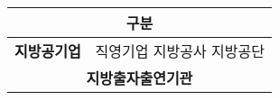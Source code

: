 \begin{tabular}{c|p{2cm}}
\toprule
\multicolumn{2}{c}{\textbf{구분}} \\
\midrule
\textbf{지방공기업} & 직영기업 \newline 지방공사 \newline  지방공단 \\
\midrule
\multicolumn{2}{c}{\textbf{지방출자출연기관}} \\
\bottomrule
\end{tabular}
